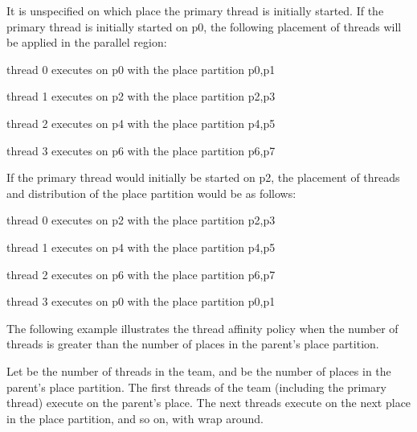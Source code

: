 
It is unspecified on which place the primary thread is initially started. If the 
primary thread is initially started on p0, the following placement of threads will 
be applied in the parallel region:

\begin{compactitem}
\item thread 0 executes on p0 with the place partition p0,p1

\item thread 1 executes on p2 with the place partition p2,p3

\item thread 2 executes on p4 with the place partition p4,p5

\item thread 3 executes on p6 with the place partition p6,p7
\end{compactitem}


If the primary thread would initially be started on p2, the placement of threads 
and distribution of the place partition would be as follows:

\begin{compactitem}
\item thread 0 executes on p2 with the place partition p2,p3

\item thread 1 executes on p4 with the place partition p4,p5

\item thread 2 executes on p6 with the place partition p6,p7

\item thread 3 executes on p0 with the place partition p0,p1
\end{compactitem}

The following example illustrates the  thread affinity policy when 
the number of threads is greater than the number of places in the parent's place 
partition.

Let  be the number of threads in the team, and  be the number of places in the 
parent's place partition. The first  threads of the team (including the primary
thread) execute on the parent's place. The next  threads execute on the next 
place in the place partition, and so on, with wrap around. 



